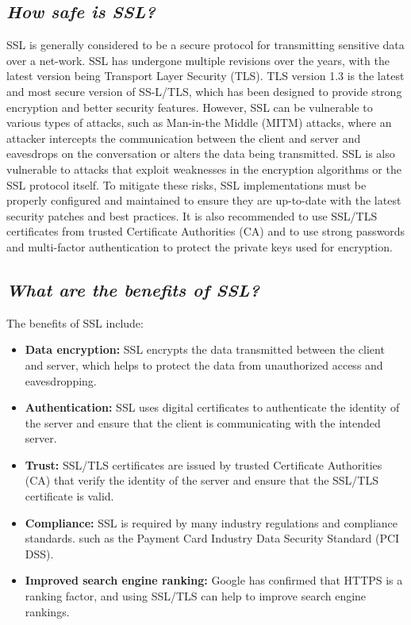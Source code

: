\documentclass{article}
\begin{document}
\subsection{\textit{How safe is SSL?}}
SSL is generally considered to be a secure protocol for transmitting sensitive data over a net-work. SSL has undergone multiple revisions over the years, with the latest version being Transport Layer Security (TLS). TLS version 1.3 is the latest and most secure version of SS-L/TLS, which has been designed to provide strong encryption and better security features.
However, SSL can be vulnerable to various types of attacks, such as Man-in-the Middle (MITM) attacks, where an attacker intercepts the communication between the client and server and eavesdrops on the conversation or alters the data being transmitted. SSL is also vulnerable to attacks that exploit weaknesses in the encryption algorithms or the SSL protocol itself.
To mitigate these risks, SSL implementations must be properly configured and maintained to ensure they are up-to-date with the latest security patches and best practices. It is also recommended to use SSL/TLS certificates from trusted Certificate Authorities (CA) and to use strong passwords and multi-factor authentication to protect the private keys used for encryption.
\subsection{\textit{What are the benefits of SSL?}}
The benefits of SSL include:
\begin{itemize}
	\item \textbf{Data encryption:} SSL encrypts the data transmitted between the client and server, which helps to protect the data from unauthorized access and eavesdropping.
	\item \textbf{Authentication:} SSL uses digital certificates to authenticate the identity of the server and ensure that the client is communicating with the intended server.
	\item \textbf{Trust:} SSL/TLS certificates are issued by trusted Certificate Authorities (CA) that verify the identity of the server and ensure that the SSL/TLS certificate is valid.
	\item \textbf{Compliance:} SSL is required by many industry regulations and compliance standards.
	such as the Payment Card Industry Data Security Standard (PCI DSS).
	\item \textbf{Improved search engine ranking:} Google has confirmed that HTTPS is a ranking factor, and using SSL/TLS can help to improve search engine rankings.
	
\end{itemize}
\end{document}
